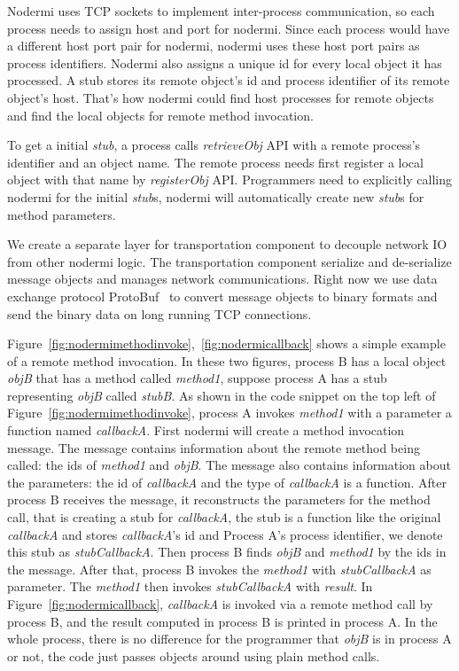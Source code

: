Nodermi uses TCP sockets to implement inter-process communication,
so each process needs to assign host and port for nodermi.
Since each process would have a different host port pair for nodermi,
nodermi uses these host port pairs as process identifiers.
Nodermi also assigns a unique id for every local object it has processed.
A stub stores its remote object's id and process identifier of its remote object's host.
That's how nodermi could find host processes for remote objects and
find the local objects for remote method invocation.

To get a initial \emph{stub}, a process 
calls \emph{retrieveObj} API with a remote process's identifier and 
an object name.
The remote process needs first register a local object with that name by
\emph{registerObj} API.
Programmers need to explicitly calling nodermi for the initial \emph{stub}s,
nodermi will automatically create new \emph{stub}s for method parameters.


We create a separate layer for transportation component to decouple network
IO from other nodermi logic.
The transportation component serialize and de-serialize message objects
and manages network communications.
Right now we use data exchange protocol ProtoBuf~\cite{protobuf} to convert message objects to binary
formats and send the binary data on long running TCP connections.



\nodrmimethodinvokefig{}
\nodrmicallbackfig{}

Figure~\ref{fig:nodermimethodinvoke},~\ref{fig:nodermicallback} shows a simple example
of a remote method invocation.
In these two figures, process B has a local object \emph{objB} that has a method called \emph{method1},
suppose process A has a stub representing \emph{objB} called \emph{stubB}.
As shown in the code snippet on the top left of Figure~\ref{fig:nodermimethodinvoke},
process A invokes \emph{method1} with a parameter a function named \emph{callbackA}.
First nodermi will create a method invocation message.
The message contains information about the remote method being called:
the ids of \emph{method1} and \emph{objB}.
The message also contains information about the parameters:
the id of \emph{callbackA} and the type of \emph{callbackA} is a function.
After process B receives the message,
it reconstructs the parameters for the method call,
that is creating a stub for \emph{callbackA},
the stub is a function like the original \emph{callbackA} and 
stores \emph{callbackA}'s id and Process A's process identifier,
we denote this stub as \emph{stubCallbackA}.
Then process B finds \emph{objB} and \emph{method1} by the ids in the message.
After that,
process B invokes the \emph{method1} with \emph{stubCallbackA} as parameter.
The \emph{method1} then invokes \emph{stubCallbackA} with \emph{result}.
In Figure~\ref{fig:nodermicallback}, \emph{callbackA} is invoked
via a remote method call by process B,
and the result computed in process B is printed in process A.
In the whole process, there is no difference for the programmer that \emph{objB}
is in process A or not, the code just passes objects around using plain method calls.


